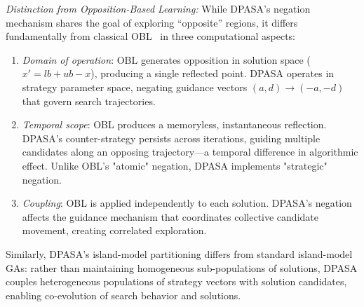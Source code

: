 \documentclass[11pt]{article}
\begin{document}
\textit{Distinction from Opposition-Based Learning:} While DPASA's negation mechanism shares the goal of exploring ``opposite'' regions, it differs fundamentally from classical OBL~\citep{tizhoosh2005opposition} in three computational aspects:
\begin{enumerate}
    \item \textit{Domain of operation}: OBL generates opposition in solution space ($x' = lb + ub - x$), producing a single reflected point. DPASA operates in strategy parameter space, negating guidance vectors $(a, d) \to (-a, -d)$ that govern search trajectories.
    \item \textit{Temporal scope}: OBL produces a memoryless, instantaneous reflection. DPASA's counter-strategy persists across iterations, guiding multiple candidates along an opposing trajectory---a temporal difference in algorithmic effect. Unlike OBL's "atomic" negation, DPASA implements "strategic" negation.
    \item \textit{Coupling}: OBL is applied independently to each solution. DPASA's negation affects the guidance mechanism that coordinates collective candidate movement, creating correlated exploration.
\end{enumerate}
Similarly, DPASA's island-model partitioning differs from standard island-model GAs: rather than maintaining homogeneous sub-populations of solutions, DPASA couples heterogeneous populations of strategy vectors with solution candidates, enabling co-evolution of search behavior and solutions.
\end{document}
